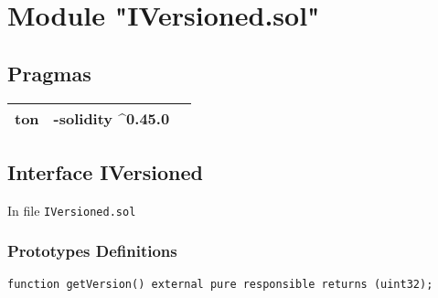 
\section{Module "IVersioned.sol"}


\subsection{Pragmas}


\noindent\begin{tabular}{|l|l|p{5cm}|}\hline
ton & -solidity \^{}0.45.0 &\\\hline
\end{tabular}


\subsection{Interface IVersioned}


In file {\tt IVersioned.sol}

\subsubsection{Prototypes Definitions}

\vspace{2cm}

\begin{lstlisting}[firstnumber=4]
    function getVersion() external pure responsible returns (uint32);
\end{lstlisting}
